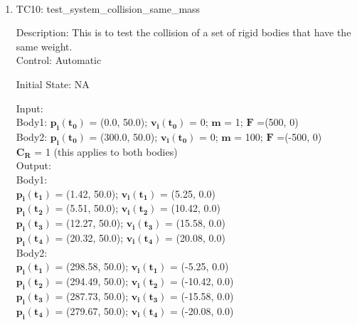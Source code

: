 \documentclass[12pt, titlepage]{article}
\begin{document}
\paragraph{}
\begin{enumerate}
	
	\item{TC10: test\_system\_collision\_same\_mass\\}
	
	Description: This is to test the collision of a set of rigid bodies that have the same weight.\\
	
	Control: Automatic
	
	Initial State: NA
	
	Input:\\
	Body1: $\mathbf{p_i}$$\mathbf{(t_0)}$ = (0.0, 50.0); $\mathbf{v_i}$$\mathbf{(t_0)}$ = 0; $\mathbf{m}$ = 1; $\mathbf{F}$ =(500, 0) \\ 
	Body2: $\mathbf{p_i}$$\mathbf{(t_0)}$ = (300.0, 50.0); $\mathbf{v_i}$$\mathbf{(t_0)}$ = 0; $\mathbf{m}$ = 100; $\mathbf{F}$ =(-500, 0) \\ 
	$\mathbf{C_R}$$\mathbf{}$ = 1 (this applies to both bodies) \\
	
	
	Output: \\
	Body1:\\
	$\mathbf{p_i}$$\mathbf{(t_1)}$ = (1.42, 50.0);
	$\mathbf{v_i}$$\mathbf{(t_1)}$ = (5.25, 0.0)\\
	$\mathbf{p_i}$$\mathbf{(t_2)}$ = (5.51, 50.0);
	$\mathbf{v_i}$$\mathbf{(t_2)}$ = (10.42, 0.0)\\
	$\mathbf{p_i}$$\mathbf{(t_3)}$ = (12.27, 50.0);
	$\mathbf{v_i}$$\mathbf{(t_3)}$ = (15.58, 0.0)\\
	$\mathbf{p_i}$$\mathbf{(t_4)}$ = (20.32, 50.0);
	$\mathbf{v_i}$$\mathbf{(t_4)}$ = (20.08, 0.0)\\
	
	Body2:\\
	$\mathbf{p_i}$$\mathbf{(t_1)}$ = (298.58, 50.0);
	$\mathbf{v_i}$$\mathbf{(t_1)}$ = (-5.25, 0.0)\\
	$\mathbf{p_i}$$\mathbf{(t_2)}$ = (294.49, 50.0);
	$\mathbf{v_i}$$\mathbf{(t_2)}$ = (-10.42, 0.0)\\
	$\mathbf{p_i}$$\mathbf{(t_3)}$ = (287.73, 50.0);
	$\mathbf{v_i}$$\mathbf{(t_3)}$ = (-15.58, 0.0)\\
	$\mathbf{p_i}$$\mathbf{(t_4)}$ = (279.67, 50.0);
	$\mathbf{v_i}$$\mathbf{(t_4)}$ = (-20.08, 0.0)\\
	 

\end{enumerate}
\end{document}
